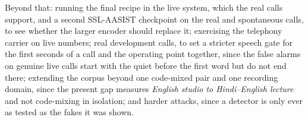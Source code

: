 Beyond that: running the final recipe in the live system, which the real calls support, and
a second SSL-AASIST checkpoint on the real and spontaneous calls, to see whether the larger
encoder should replace it;
exercising the telephony carrier on live numbers; real development calls, to set a stricter
speech gate for the first seconds of a call and the operating point together, since the false
alarms on genuine live calls start with the quiet before the first word but do not end there;
extending the
corpus beyond one code-mixed pair and one recording domain, since the present gap
measures \emph{English studio to Hindi--English lecture} and not code-mixing in
isolation; and harder attacks, since a detector is only ever as tested as the fakes
it was shown.
